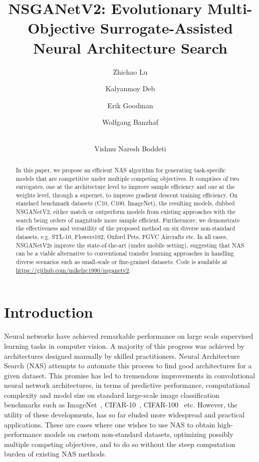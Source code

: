\documentclass[runningheads]{llncs}
\def\ourmodel{NSGANetV2}
\begin{document}
\pagestyle{headings}
\mainmatter
\title{\ourmodel{}: Evolutionary Multi-Objective Surrogate-Assisted Neural Architecture Search} 

\author{Zhichao Lu \and Kalyanmoy Deb \and Erik Goodman \and Wolfgang Banzhaf \and\\Vishnu Naresh Boddeti}
\maketitle



\begin{abstract}
In this paper, we propose an efficient NAS algorithm for generating task-specific models that are competitive under multiple competing objectives. It comprises of two surrogates, one at the architecture level to improve sample efficiency and one at the weights level, through a supernet, to improve gradient descent training efficiency. On standard benchmark datasets (C10, C100, ImageNet), the resulting models, dubbed NSGANetV2, either match or outperform models from existing approaches with the search being orders of magnitude more sample efficient. Furthermore, we demonstrate the effectiveness and versatility of the proposed method on six diverse non-standard datasets, e.g. STL-10, Flowers102, Oxford Pets, FGVC Aircrafts etc. In all cases, NSGANetV2s improve the state-of-the-art (under mobile setting), suggesting that NAS can be a viable alternative to conventional transfer learning approaches in handling diverse scenarios such as small-scale or fine-grained datasets. Code is available at \url{https://github.com/mikelzc1990/nsganetv2}.

\end{abstract}
 \section{Introduction}
Neural networks have achieved remarkable performance on large scale supervised learning tasks in computer vision. A majority of this progress was achieved by architectures designed manually by skilled practitioners. Neural Architecture Search (NAS) \cite{nasnet} attempts to automate this process to find good architectures for a given dataset. This promise has led to tremendous improvements in convolutional neural network architectures, in terms of predictive performance, computational complexity and model size on standard large-scale image classification benchmarks such as ImageNet~\cite{imagenet}, CIFAR-10~\cite{cifar}, CIFAR-100~\cite{cifar} etc. However, the utility of these developments, has so far eluded more widespread and practical applications. These are cases where one wishes to use NAS to obtain high-performance models on custom non-standard datasets, optimizing possibly multiple competing objectives, and to do so without the steep computation burden of existing NAS methods.
\end{document}
